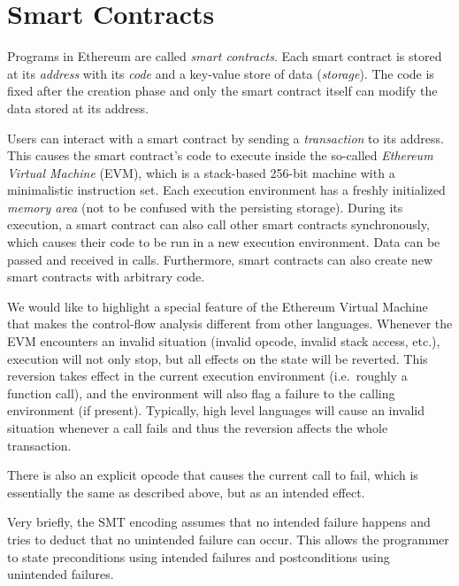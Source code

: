 \section{Smart Contracts}
\label{section:smart_contracts}


Programs in Ethereum are called \emph{smart contracts}.
Each smart contract is stored at its \emph{address} with its \emph{code}
and a key-value store of data (\emph{storage}). The code is fixed after the creation phase
and only the smart contract itself can modify the data stored at its address.

Users can interact with a smart contract by sending a \emph{transaction}
to its address. This causes the smart contract's code to execute inside
the so-called \emph{Ethereum Virtual Machine} (EVM), which is a stack-based
256-bit machine with a minimalistic instruction set. Each execution environment
has a freshly initialized \emph{memory area} (not to be confused with the persisting
storage). During its execution, a smart contract can also call other
smart contracts synchronously, which causes their code to be run in
a new execution environment. Data can be passed and received in calls.
Furthermore, smart contracts can also create new smart contracts with
arbitrary code.


We would like to highlight a special feature of the Ethereum Virtual Machine
that makes the control-flow analysis different from other languages.
Whenever the EVM encounters an invalid situation (invalid opcode, invalid
stack access, etc.), execution will not only stop, but all effects on the
state will be reverted. This reversion takes effect in the current execution
environment (i.e.\ roughly a function call), and the environment will also
flag a failure to the calling environment (if present). Typically, high level languages
will cause an invalid situation whenever a call fails and thus the reversion
affects the whole transaction.

There is also an explicit opcode that causes the current call to fail, which is
essentially the same as described above, but as an intended effect.


Very briefly, the SMT encoding assumes that no intended failure happens
and tries to deduct that no unintended failure can occur. This allows the
programmer to state preconditions using intended failures and postconditions
using unintended failures.
